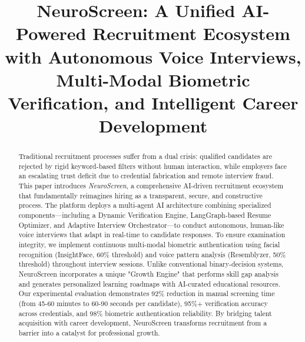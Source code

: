 \documentclass[conference]{IEEEtran}
\begin{document}
\title{NeuroScreen: A Unified AI-Powered Recruitment Ecosystem with Autonomous Voice Interviews, Multi-Modal Biometric Verification, and Intelligent Career Development}

\author{
}

\maketitle

\begin{abstract}
Traditional recruitment processes suffer from a dual crisis: qualified candidates are rejected by rigid keyword-based filters without human interaction, while employers face an escalating trust deficit due to credential fabrication and remote interview fraud. This paper introduces \textit{NeuroScreen}, a comprehensive AI-driven recruitment ecosystem that fundamentally reimagines hiring as a transparent, secure, and constructive process. The platform deploys a multi-agent AI architecture combining specialized components—including a Dynamic Verification Engine, LangGraph-based Resume Optimizer, and Adaptive Interview Orchestrator—to conduct autonomous, human-like voice interviews that adapt in real-time to candidate responses. To ensure examination integrity, we implement continuous multi-modal biometric authentication using facial recognition (InsightFace, 60\% threshold) and voice pattern analysis (Resemblyzer, 50\% threshold) throughout interview sessions. Unlike conventional binary-decision systems, NeuroScreen incorporates a unique "Growth Engine" that performs skill gap analysis and generates personalized learning roadmaps with AI-curated educational resources. Our experimental evaluation demonstrates 92\% reduction in manual screening time (from 45-60 minutes to 60-90 seconds per candidate), 95\%+ verification accuracy across credentials, and 98\% biometric authentication reliability. By bridging talent acquisition with career development, NeuroScreen transforms recruitment from a barrier into a catalyst for professional growth.
\end{abstract}
\end{document}
